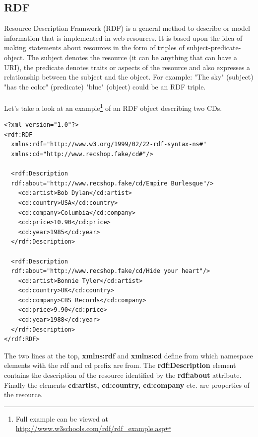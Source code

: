 \subsection{RDF}
Resource Description Framwork (RDF) is a general method to describe or model information that is implemented in web resources. It is based upon the idea of making statements about resources in the form of triples of subject-predicate-object.\cite{rdfIntroBib} The subject denotes the resource (it can be anything that can have a URI), the predicate denotes traits or aspects of the resource and also expresses a relationship between the subject and the object. For example: "The sky" (subject) "has the color" (predicate) "blue" (object) could be an RDF triple.\\\\
Let's take a look at an example\footnote{Full example can be viewed at \url{http://www.w3schools.com/rdf/rdf_example.asp}} of an RDF object describing two CDs.\\
\begin{verbatim}
<?xml version="1.0"?>
<rdf:RDF 
  xmlns:rdf="http://www.w3.org/1999/02/22-rdf-syntax-ns#"
  xmlns:cd="http://www.recshop.fake/cd#"/>

  <rdf:Description
  rdf:about="http://www.recshop.fake/cd/Empire Burlesque"/>
    <cd:artist>Bob Dylan</cd:artist>
    <cd:country>USA</cd:country>
    <cd:company>Columbia</cd:company>
    <cd:price>10.90</cd:price>
    <cd:year>1985</cd:year>
  </rdf:Description>

  <rdf:Description
  rdf:about="http://www.recshop.fake/cd/Hide your heart"/>
    <cd:artist>Bonnie Tyler</cd:artist>
    <cd:country>UK</cd:country>
    <cd:company>CBS Records</cd:company>
    <cd:price>9.90</cd:price>
    <cd:year>1988</cd:year>
  </rdf:Description>
</rdf:RDF>
\end{verbatim}
\linebreak
\newline
The two lines at the top, \textbf{xmlns:rdf} and \textbf{xmlns:cd} define from which namespace elements with the rdf and cd prefix are from. The \textbf{rdf:Description} element contains the description of the resource identified by the \textbf{rdf:about} attribute. Finally the elements \textbf{cd:artist, cd:country, cd:company} etc. are properties of the resource.

